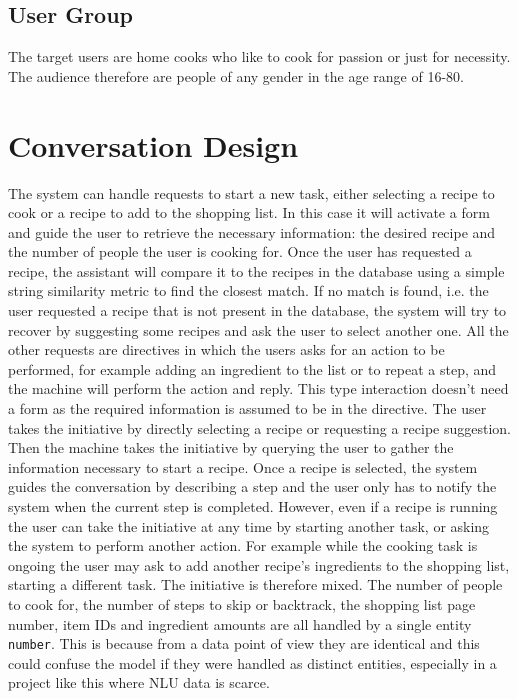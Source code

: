 \documentclass[journal, 11pt]{IEEEtran}
\begin{document}
\subsection{User Group}
The target users are home cooks who like to cook for passion or just for necessity.
The audience therefore are people of any gender in the age range of 16-80.


\section{Conversation Design}
\label{sec:conv-design}
The system can handle requests to start a new task, either selecting a recipe to cook or a recipe to add to the shopping list. In this case it will activate a form and guide the user to retrieve the necessary information: the desired recipe and the number of people the user is cooking for.
Once the user has requested a recipe, the assistant will compare it to the recipes in the database using a simple string similarity metric to find the closest match. If no match is found, i.e. the user requested a recipe that is not present in the database, the system will try to recover by suggesting some recipes and ask the user to select another one.
All the other requests are directives in which the users asks for an action to be performed, for example adding an ingredient to the list or to repeat a step, and the machine will perform the action and reply. This type interaction doesn't need a form as the required information is assumed to be in the directive.
The user takes the initiative by directly selecting a recipe or requesting a recipe suggestion. Then the machine takes the initiative by querying the user to gather the information necessary to start a recipe.
Once a recipe is selected, the system guides the conversation by describing a step and the user only has to notify the system when the current step is completed.
However, even if a recipe is running the user can take the initiative at any time by starting another task, or asking the system to perform another action. For example while the cooking task is ongoing the user may ask to add another recipe's ingredients to the shopping list, starting a different task.
The initiative is therefore mixed.
The number of people to cook for, the number of steps to skip or backtrack, the shopping list page number, item IDs and ingredient amounts are all handled by a single entity \texttt{number}.
This is because from a data point of view they are identical and this could confuse the model if they were handled as distinct entities, especially in a project like this where NLU data is scarce.
\end{document}

